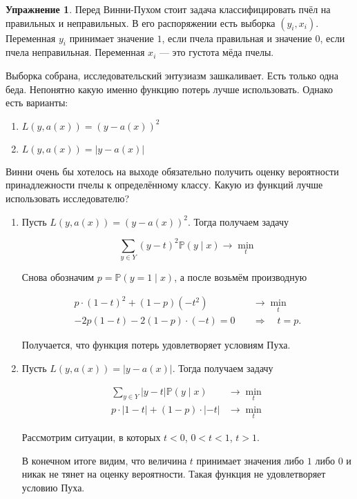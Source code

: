 \documentclass[12pt, a4paper, oneside]{extreport}
\def \mbb{\mathbb}
\def \PP{\mbb{P}}
\theoremstyle{plain}              %
\theoremstyle{definition}         %
\newtheorem{problem}{\color{myblue} Упражнение}
\begin{document}
\begin{problem}\label{log_reg_2}
Перед Винни-Пухом стоит задача классифицировать пчёл на правильных и неправильных. В его распоряжении есть выборка $(y_i,x_i)$. Переменная $y_i$ принимает значение $1$, если пчела правильная и значение $0$, если пчела неправильная. Переменная $x_i$ --- это густота мёда пчелы. 

Выборка собрана, исследовательский энтузиазм зашкаливает. Есть только одна беда. Непонятно какую именно функцию потерь лучше использовать. Однако есть варианты: 

\begin{enumerate}\label{abs_0_1}
\item $L(y,a(x)) = (y - a(x))^2$
\item $L(y,a(x)) = |y - a(x)|$

\end{enumerate}

Винни очень бы хотелось на выходе обязательно получить оценку вероятности принадлежности пчелы к определённому классу. Какую из функций лучше использовать исследователю? 

\begin{sol}

\begin{enumerate}
\item Пусть $L(y,a(x)) = (y - a(x))^2$. Тогда получаем задачу 

\[
\sum_{y \in Y} (y - t)^2 \PP(y \mid x) \to \min_t
\]

Снова обозначим $ p = \PP(y = 1 \mid x)$, а после возьмём производную

\begin{align*}
p \cdot (1 - t)^2 + (1 - p) (-t^2) &\to \min_t \\
-2p(1-t) - 2(1-p)\cdot(-t) = 0 \quad &\Rightarrow \quad t = p.
\end{align*}

Получается, что функция потерь удовлетворяет условиям Пуха. 

\item Пусть $L(y,a(x)) = |y - a(x)|$. Тогда получаем задачу 


\begin{align*}
\sum_{y \in Y} |y - t| \PP(y \mid x) &\to \min_t \\ 
p \cdot |1-t| + (1-p) \cdot |-t| & \to \min_t
\end{align*}

Рассмотрим ситуации, в которых $t<0$, $0 < t < 1$, $t >1$. 


В конечном итоге видим, что величина $t$ принимает значения либо $1$ либо $0$ и никак не тянет на оценку вероятности. Такая функция не удовлетворяет условию Пуха. 


\end{enumerate}
\end{sol}
\end{problem}
\end{document}

